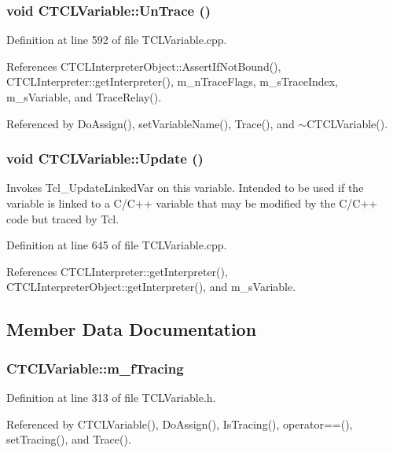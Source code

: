 \subsubsection{\setlength{\rightskip}{0pt plus 5cm}void CTCLVariable::Un\-Trace ()}\label{classCTCLVariable_a16}




Definition at line 592 of file TCLVariable.cpp.

References CTCLInterpreter\-Object::Assert\-If\-Not\-Bound(), CTCLInterpreter::get\-Interpreter(), m\_\-n\-Trace\-Flags, m\_\-s\-Trace\-Index, m\_\-s\-Variable, and Trace\-Relay().

Referenced by Do\-Assign(), set\-Variable\-Name(), Trace(), and $\sim$CTCLVariable().
\subsubsection{\setlength{\rightskip}{0pt plus 5cm}void CTCLVariable::Update ()}\label{classCTCLVariable_a17}


Invokes Tcl\_\-Update\-Linked\-Var on this variable. Intended to be used if the variable is linked to a C/C++ variable that may be modified by the C/C++ code but traced by Tcl. 

Definition at line 645 of file TCLVariable.cpp.

References CTCLInterpreter::get\-Interpreter(), CTCLInterpreter\-Object::get\-Interpreter(), and m\_\-s\-Variable.

\subsection{Member Data Documentation}
\subsubsection{ CTCLVariable::m\_\-f\-Tracing\hspace{0.3cm}{\tt  [private]}}\label{classCTCLVariable_o1}




Definition at line 313 of file TCLVariable.h.

Referenced by CTCLVariable(), Do\-Assign(), Is\-Tracing(), operator==(), set\-Tracing(), and Trace().
